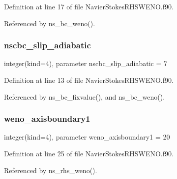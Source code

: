 Definition at line 17 of file Navier\+Stokes\+R\+H\+S\+W\+E\+N\+O.\+f90.



Referenced by ns\+\_\+bc\+\_\+weno().

\hypertarget{namespacenavierstokesrhsweno_a61b688d5e56fecdb26047d0427b4180d}{}\label{namespacenavierstokesrhsweno_a61b688d5e56fecdb26047d0427b4180d} 
\subsubsection{\texorpdfstring{nscbc\+\_\+slip\+\_\+adiabatic}{nscbc\_slip\_adiabatic}}
{\footnotesize\ttfamily integer(kind=4), parameter nscbc\+\_\+slip\+\_\+adiabatic = 7}



Definition at line 13 of file Navier\+Stokes\+R\+H\+S\+W\+E\+N\+O.\+f90.



Referenced by ns\+\_\+bc\+\_\+fixvalue(), and ns\+\_\+bc\+\_\+weno().

\hypertarget{namespacenavierstokesrhsweno_af94f674d95f5f5ef6262da407a7fd4c8}{}\label{namespacenavierstokesrhsweno_af94f674d95f5f5ef6262da407a7fd4c8} 
\subsubsection{\texorpdfstring{weno\+\_\+axisboundary1}{weno\_axisboundary1}}
{\footnotesize\ttfamily integer(kind=4), parameter weno\+\_\+axisboundary1 = 20}



Definition at line 25 of file Navier\+Stokes\+R\+H\+S\+W\+E\+N\+O.\+f90.



Referenced by ns\+\_\+rhs\+\_\+weno().

\hypertarget{namespacenavierstokesrhsweno_a903f5f21fcefb6a5062f328e7a8b8164}{}\label{namespacenavierstokesrhsweno_a903f5f21fcefb6a5062f328e7a8b8164} 
